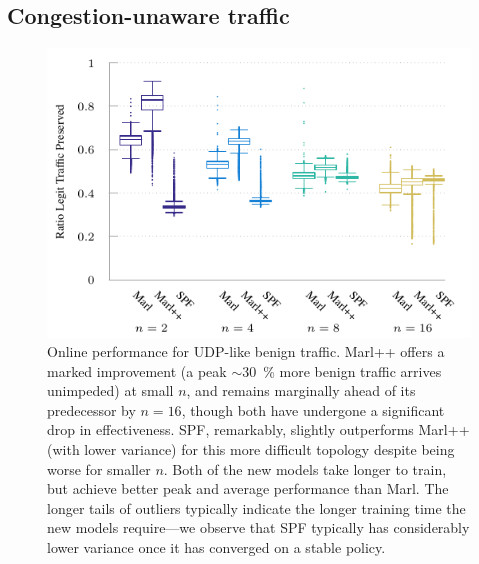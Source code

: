 \documentclass[conference, a4paper, 10pt, times]{IEEEtran}
\begin{document}
\subsection{Congestion-unaware traffic}
%	
%	
\begin{figure}
	\centering
	\includegraphics[width=0.95\linewidth]{../plots/udp-box}
	
	\caption{
		Online performance for UDP-like benign traffic.
		Marl++ offers a marked improvement (a peak $\sim$\SI{30}{\percent} more benign traffic arrives unimpeded) at small $n$, and remains marginally ahead of its predecessor by $n=16$, though both have undergone a significant drop in effectiveness.
		SPF, remarkably, slightly outperforms Marl++ (with lower variance) for this more difficult topology despite being worse for smaller $n$.
		Both of the new models take longer to train, but achieve better peak and average performance than Marl.
		The longer tails of outliers typically indicate the longer training time the new models require---we observe that SPF typically has considerably lower variance once it has converged on a stable policy.
		\label{fig:udp-box}
	}
\end{figure}
\end{document}
